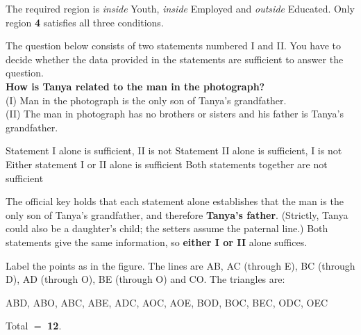 
The required region is \emph{inside} Youth, \emph{inside} Employed and \emph{outside} Educated. Only region \textbf{4} satisfies all three conditions.

The question below consists of two statements numbered I and II. You have to decide whether the data provided in the statements are sufficient to answer the question.\\
\textbf{How is Tanya related to the man in the photograph?}\\
(I) Man in the photograph is the only son of Tanya's grandfather.\\
(II) The man in photograph has no brothers or sisters and his father is Tanya's grandfather.

Statement I alone is sufficient, II is not
Statement II alone is sufficient, I is not
Either statement I or II alone is sufficient
Both statements together are not sufficient

The official key holds that each statement alone establishes that the man is the only son of Tanya's grandfather, and therefore \textbf{Tanya's father}. (Strictly, Tanya could also be a daughter's child; the setters assume the paternal line.) Both statements give the same information, so \textbf{either I or II} alone suffices.


Label the points as in the figure. The lines are AB, AC (through E), BC (through D), AD (through O), BE (through O) and CO. The triangles are:
\begin{center}\small
ABD, ABO, ABC, ABE, ADC, AOC, AOE, BOD, BOC, BEC, ODC, OEC
\end{center}
Total $=$ \textbf{12}.


